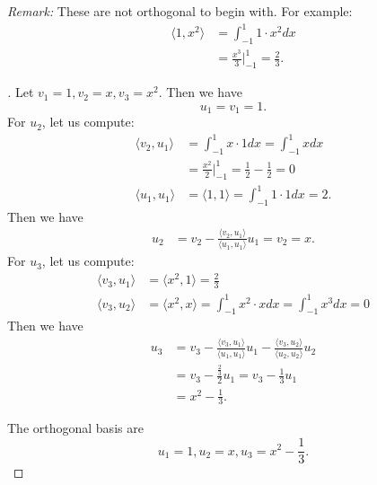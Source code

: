 \documentclass[11pt]{article}
\begin{document}
        \vspace{1em}

        \emph{Remark:} These are not orthogonal to begin with. For example:
        \begin{align*}
            \langle 1, x^2 \rangle &= \int_{-1}^{1} 1 \cdot x^2 dx \\
                                   &= \frac{x^3}{3} \bigg|_{-1}^{1} = \frac{2}{3}.
        \end{align*}

        \begin{proof}[\unskip\nopunct]
            Let \(v_1 = 1, v_2 = x, v_3 = x^2\). Then we have \[u_1 = v_1 = 1.\] For \(u_2\), let us compute:
            \begin{align*}
                \langle v_2, u_1 \rangle &= \int_{-1}^{1} x \cdot 1 dx = \int_{-1}^{1} x dx \\
                &= \frac{x^2}{2} \bigg|_{-1}^{1} = \frac{1}{2} - \frac{1}{2} = 0 \\
                \langle u_1, u_1 \rangle &= \langle 1,1 \rangle = \int_{-1}^{1} 1 \cdot 1 dx = 2.
            \end{align*}
            Then we have 
            \begin{align*}
                u_2 &= v_2 - \frac{\langle v_2, u_1 \rangle}{\langle u_1, u_1 \rangle} u_1 = v_2 = x.
            \end{align*}
            For \(u_3\), let us compute:
            \begin{align*}
                \langle v_3, u_1 \rangle &= \langle x^2, 1 \rangle = \frac{2}{3} \\
                \langle v_3, u_2 \rangle &= \langle x^2, x \rangle = \int_{-1}^{1} x^2 \cdot x dx = \int_{-1}^{1} x^3 dx = 0
            \end{align*}
            Then we have 
            \begin{align*}
                u_3 &= v_3 - \frac{\langle v_3, u_1 \rangle}{\langle u_1, u_1 \rangle} u_1 - \frac{\langle v_3, u_2 \rangle}{\langle u_2, u_2 \rangle} u_2 \\
                &= v_3 - \frac{\frac{2}{3}}{2} u_1 = v_3 - \frac{1}{3} u_1 \\
                &= x^2 - \frac{1}{3}.
            \end{align*}

        The orthogonal basis are \[u_1 = 1, u_2 = x, u_3 = x^2 - \frac{1}{3}.\]
        \end{proof}
\end{document}
